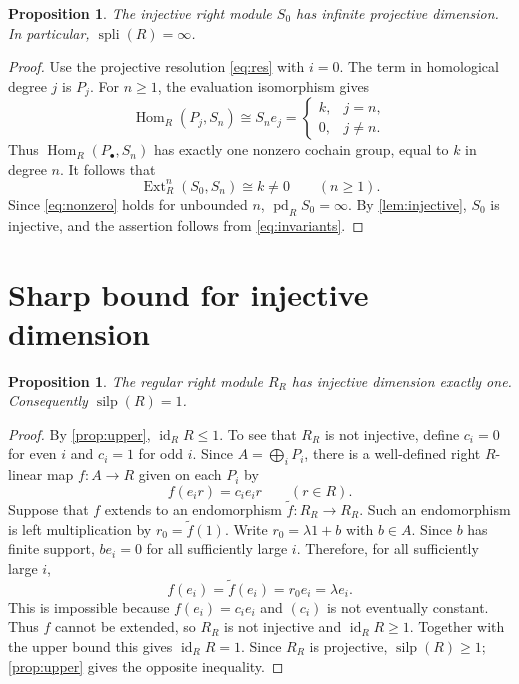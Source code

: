 \documentclass[11pt]{amsart}
\newtheorem{proposition}[theorem]{Proposition}
\theoremstyle{definition}
\theoremstyle{remark}
\newcommand{\silp}{\operatorname{silp}}
\newcommand{\spli}{\operatorname{spli}}
\newcommand{\pd}{\operatorname{pd}}
\newcommand{\idim}{\operatorname{id}}
\newcommand{\Ext}{\operatorname{Ext}}
\newcommand{\Hom}{\operatorname{Hom}}
\begin{document}
\begin{proposition}\label{prop:lower}
The injective right module $S_0$ has infinite projective dimension. In particular, $\spli(R)=\infty$.
\end{proposition}
\begin{proof}
Use the projective resolution \eqref{eq:res} with $i=0$. The term in homological degree $j$ is $P_j$. For $n\geq1$, the evaluation isomorphism gives
\[
\Hom_R(P_j,S_n)\cong S_ne_j=
\begin{cases}k,&j=n,\\0,&j\ne n.\end{cases}
\]
Thus $\Hom_R(P_\bullet,S_n)$ has exactly one nonzero cochain group, equal to $k$ in degree $n$. It follows that
\begin{equation}\label{eq:nonzero}
\Ext_R^n(S_0,S_n)\cong k\ne0\qquad(n\geq1).
\end{equation}
Since \eqref{eq:nonzero} holds for unbounded $n$, $\pd_R S_0=\infty$. By \cref{lem:injective}, $S_0$ is injective, and the assertion follows from \eqref{eq:invariants}.
\end{proof}

\section{Sharp bound for injective dimension}\label{sec:sharp}
\begin{proposition}\label{prop:sharp}
The regular right module $R_R$ has injective dimension exactly one. Consequently $\silp(R)=1$.
\end{proposition}
\begin{proof}
By \cref{prop:upper}, $\idim_R R\leq1$. To see that $R_R$ is not injective, define $c_i=0$ for even $i$ and $c_i=1$ for odd $i$. Since $A=\bigoplus_i P_i$, there is a well-defined right $R$-linear map $f:A\to R$ given on each $P_i$ by
\[
f(e_i r)=c_i e_i r\qquad(r\in R).
\]
Suppose that $f$ extends to an endomorphism $\widetilde f:R_R\to R_R$. Such an endomorphism is left multiplication by $r_0=\widetilde f(1)$. Write $r_0=\lambda1+b$ with $b\in A$. Since $b$ has finite support, $be_i=0$ for all sufficiently large $i$. Therefore, for all sufficiently large $i$,
\[
f(e_i)=\widetilde f(e_i)=r_0e_i=\lambda e_i.
\]
This is impossible because $f(e_i)=c_ie_i$ and $(c_i)$ is not eventually constant. Thus $f$ cannot be extended, so $R_R$ is not injective and $\idim_R R\geq1$. Together with the upper bound this gives $\idim_R R=1$. Since $R_R$ is projective, $\silp(R)\geq1$; \cref{prop:upper} gives the opposite inequality.
\end{proof}
\end{document}
